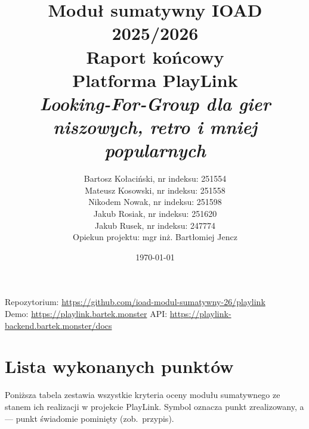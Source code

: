\documentclass[12pt,a4paper]{article}
\title{
    \large Moduł sumatywny IOAD 2025/2026 \\[0.3em]
    \Huge \textbf{Raport końcowy} \\[0.3em]
    \LARGE Platforma PlayLink \\
    \large \textit{Looking-For-Group dla gier niszowych, retro i mniej popularnych}
}
\author{
    Bartosz Kołaciński, nr indeksu: 251554 \\
    Mateusz Kosowski, nr indeksu: 251558 \\
    Nikodem Nowak, nr indeksu: 251598 \\
    Jakub Rosiak, nr indeksu: 251620 \\
    Jakub Rusek, nr indeksu: 247774 \\[0.6em]
    \normalsize Opiekun projektu: mgr inż. Bartłomiej Jencz
}
\date{\today}
\newcommand{\done}{\textcolor{okgreen}{\ding{51}}}
\newcommand{\na}{\textcolor{gray}{\ding{55}}}
\begin{document}
\maketitle
\begin{center}
\small
Repozytorium: \url{https://github.com/ioad-modul-sumatywny-26/playlink} \\
Demo: \url{https://playlink.bartek.monster} \quad\textbullet\quad
API: \url{https://playlink-backend.bartek.monster/docs}
\end{center}
\newpage

\tableofcontents
\newpage

\section{Lista wykonanych punktów}
\label{sec:lista}

Poniższa tabela zestawia wszystkie kryteria oceny modułu sumatywnego ze stanem ich
realizacji w projekcie PlayLink. Symbol \done{} oznacza punkt zrealizowany,
a \na{} — punkt świadomie pominięty (zob.\ przypis).
\end{document}
